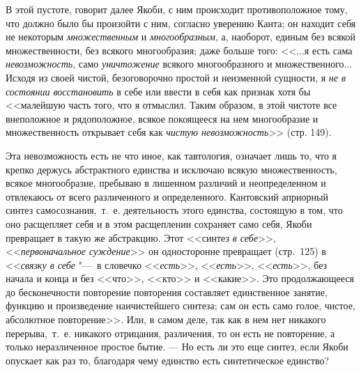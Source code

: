 В этой пустоте, говорит далее Якоби, с ним происходит противоположное тому,
что должно было бы произойти с ним, согласно уверению Канта; он находит
себя не некоторым {\em множественным} и
{\em многообразным}, а, наоборот, единым без всякой
множественности, без всякого многообразия; даже больше того: <<...я есть
сама {\em невозможность}, само
{\em уничтожение} всякого многообразного и
множественного... Исходя из своей чистой, безоговорочно простой и
неизменной сущности, я {\em не в состоянии
восстановить} в себе или ввести в себя как признак хотя бы <<малейшую часть
того, что я отмыслил. Таким образом, в этой чистоте все внеположное и
рядоположное, всякое покоящееся на нем многообразие и множественность
открывает себя как {\em чистую невозможность}>> (стр.
149).

Эта невозможность есть не что иное, как тавтология, означает лишь то, что я
крепко держусь абстрактного единства и исключаю всякую множественность,
всякое многообразие, пребываю в лишенном различий и неопределенном и
отвлекаюсь от всего различенного и определенного. Кантовский априорный
синтез самосознания,~т.~е. деятельность этого единства, состоящую в том,
что оно расщепляет себя и в этом расщеплении сохраняет само себя, Якоби
превращает в такую же абстракцию. Этот <<синтез {\em в
себе}>>, <<{\em первоначальное суждение}>> он односторонне
превращает (стр.~125) в
<<{\em связку в себе} "---~в словечко
<<{\em есть}>>, <<{\em есть}>>,
<<{\em есть}>>, без начала и конца и без <<что>>, <<кто>> и
<<какие>>. Это продолжающееся до бесконечности повторение повторения
составляет единственное занятие, функцию и произведение наичистейшего
синтеза; сам он есть само голое, чистое, абсолютное повторение>>. Или, в
самом деле, так как в нем нет никакого перерыва,~т.~е. никакого отрицания,
различения, то он есть не повторение, а только неразличенное простое бытие.
--- Но есть ли это еще синтез, если Якоби опускает как раз то, благодаря чему
единство есть синтетическое единство?

